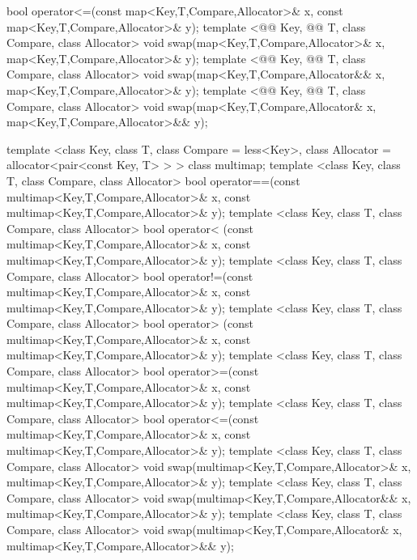 \documentclass[american,twoside]{book}
\begin{document}
\begin{codeblock}
{    bool operator<=(const map<Key,T,Compare,Allocator>& x,
                    const map<Key,T,Compare,Allocator>& y);
  template <@@ Key, @@ T, class Compare, class Allocator>
    void swap(map<Key,T,Compare,Allocator>& x,
              map<Key,T,Compare,Allocator>& y);
  template <@@ Key, @@ T, class Compare, class Allocator>
    void swap(map<Key,T,Compare,Allocator&& x,
              map<Key,T,Compare,Allocator>& y);
  template <@@ Key, @@ T, class Compare, class Allocator>
    void swap(map<Key,T,Compare,Allocator& x,
              map<Key,T,Compare,Allocator>&& y);

  template <class Key, class T, class Compare = less<Key>,
            class Allocator = allocator<pair<const Key, T> > >
    class multimap;
  template <class Key, class T, class Compare, class Allocator>
    bool operator==(const multimap<Key,T,Compare,Allocator>& x,
                    const multimap<Key,T,Compare,Allocator>& y);
  template <class Key, class T, class Compare, class Allocator>
    bool operator< (const multimap<Key,T,Compare,Allocator>& x,
                    const multimap<Key,T,Compare,Allocator>& y);
  template <class Key, class T, class Compare, class Allocator>
    bool operator!=(const multimap<Key,T,Compare,Allocator>& x,
                    const multimap<Key,T,Compare,Allocator>& y);
  template <class Key, class T, class Compare, class Allocator>
    bool operator> (const multimap<Key,T,Compare,Allocator>& x,
                    const multimap<Key,T,Compare,Allocator>& y);
  template <class Key, class T, class Compare, class Allocator>
    bool operator>=(const multimap<Key,T,Compare,Allocator>& x,
                    const multimap<Key,T,Compare,Allocator>& y);
  template <class Key, class T, class Compare, class Allocator>
    bool operator<=(const multimap<Key,T,Compare,Allocator>& x,
                    const multimap<Key,T,Compare,Allocator>& y);
  template <class Key, class T, class Compare, class Allocator>
    void swap(multimap<Key,T,Compare,Allocator>& x,
              multimap<Key,T,Compare,Allocator>& y);
  template <class Key, class T, class Compare, class Allocator>
    void swap(multimap<Key,T,Compare,Allocator&& x,
              multimap<Key,T,Compare,Allocator>& y);
  template <class Key, class T, class Compare, class Allocator>
    void swap(multimap<Key,T,Compare,Allocator& x,
              multimap<Key,T,Compare,Allocator>&& y);
}
\end{codeblock}
\end{document}
